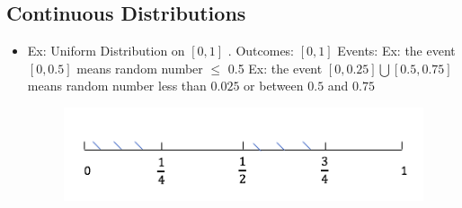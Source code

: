 \subsection{Continuous Distributions}
\begin{itemize}
	\item Ex: Uniform Distribution on $\left[ 0,1\right]$ .\newline
	Outcomes: $\left[ 0,1\right]$ \newline
	Events: Ex: the event $\left[ 0,0.5\right]$ means random number $\leq$ 0.5 \newline
	            Ex: the event $\left[ 0,0.25\right] \bigcup \left[ 0.5,0.75\right]$ means random number less than $0.025$ or between $0.5$ and $0.75$\newline
 \begin{figure}[ht!]
	\centering
	\includegraphics[width=.35\textwidth]{../figures/probability1.png}  
\end{figure}	      


\end{itemize}
